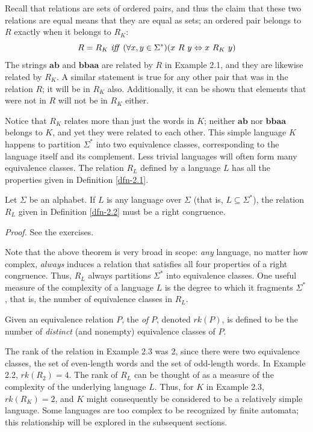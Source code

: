 Recall that relations are sets of ordered pairs, and thus the claim that these
two relations are equal means that they are equal as sets; an ordered pair
belongs to $R$ exactly when it belongs to $R_K$:
\[ R = R_K\text{ \emph{iff} }(\forall x,y \in \Sigma^*)(x\ R\ y \Leftrightarrow
	x\ R_K\ y) \]
The strings $\pmb{ab}$ and $\pmb{bbaa}$ are related by $R$ in Example 2.1, and they
are likewise related by $R_K$. A similar statement is true for any other pair
that was in the relation $R$; it will be in $R_K$ also. Additionally, it can be
shown that elements that were not in $R$ will not be in $R_K$ either.

Notice that $R_K$ relates more than just the words in $K$; neither $\pmb{ab}$ nor
$\pmb{bbaa}$ belongs to $K$, and yet they were related to each other. This simple
language $K$ happens to partition $\Sigma^*$ into two equivalence classes,
corresponding to the language itself and its complement. Less trivial languages
will often form many equivalence classes. The relation $R_L$ defined by a
language $L$ has all the properties given in Definition \ref{dfn-2.1}.

\begin{thm}\label{thm-2.1}
Let $\Sigma$ be an alphabet. If $L$ is any language over $\Sigma$ (that is,
$L \subseteq \Sigma^*$), the relation $R_L$ given in Definition \ref{dfn-2.2} must be a
right congruence.

\emph{Proof.} See the exercises.
\end{thm}

Note that the above theorem is very broad in scope: \emph{any} language, no matter
how complex, \emph{always} induces a relation that satisfies all four properties
of a right congruence. Thus, $R_L$ always partitions $\Sigma^*$ into equivalence
classes. One useful measure of the complexity of a language $L$ is the degree to
which it fragments $\Sigma^*$, that is, the number of equivalence classes in
$R_L$.

\begin{dfn}\label{dfn-2.3}
Given an equivalence relation $P$, the \emph{ of} $P$, denoted
$rk(P)$, is defined to be the number of \emph{distinct} (and nonempty)
equivalence classes of $P$.
\end{dfn}

The rank of the relation in Example 2.3 was 2, since there were two equivalence
classes, the set of even-length words and the set of odd-length words. In
Example 2.2, $rk(R_2)=4$. The rank of $R_L$ can be thought of as a measure of
the complexity of the underlying language $L$. Thus, for $K$ in Example 2.3,
$rk(R_K)=2$, and $K$ might consequently be considered to be a relatively simple
language. Some languages are too complex to be recognized by finite automata;
this relationship will be explored in the subsequent sections.

